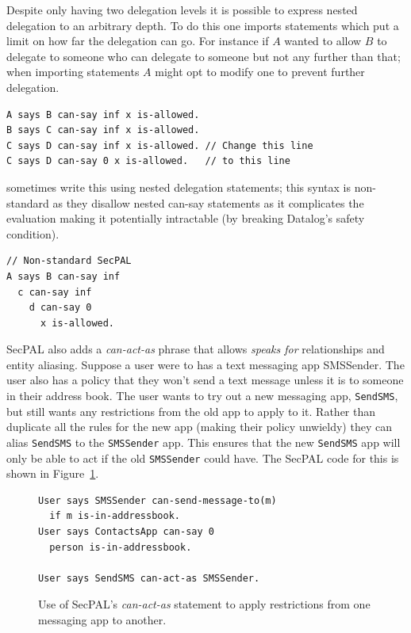 \documentclass[a4paper]{article}
\begin{document}
Despite only having two delegation levels it is possible to express nested
delegation to an arbitrary depth.  To do this one imports statements which put a
limit on how far the delegation can go.  For instance if $A$ wanted to allow $B$
to delegate to someone who can delegate to someone but not any further than
that; when importing statements $A$ might opt to modify one to prevent further
delegation.

\begin{lstlisting}[language=SecPAL]
A says B can-say inf x is-allowed.
B says C can-say inf x is-allowed. 
C says D can-say inf x is-allowed. // Change this line
C says D can-say 0 x is-allowed.   // to this line
\end{lstlisting}

\citeauthor{Becker:2006vh} sometimes write this using nested delegation
statements; this syntax is non-standard as they disallow nested can-say
statements as it complicates the evaluation making it potentially intractable
(by breaking Datalog's safety condition).

\begin{lstlisting}[language=SecPAL]
// Non-standard SecPAL
A says B can-say inf 
  c can-say inf
    d can-say 0 
      x is-allowed.
\end{lstlisting}

{SecPAL} also adds a \emph{can-act-as} phrase that allows \emph{speaks for}
relationships and entity aliasing.  Suppose a user were to has a text messaging
app SMSSender.  The user also has a policy that they won't send a text message
unless it is to someone in their address book.  The user wants to try out a new
messaging app, \texttt{SendSMS}, but still wants any restrictions from the old
app to apply to it.  Rather than duplicate all the rules for the new app (making
their policy unwieldy) they can alias \texttt{SendSMS} to the \texttt{SMSSender}
app.  This ensures that the new \texttt{SendSMS} app will only be able to act if
the old \texttt{SMSSender} could have. The SecPAL code for this is shown in
Figure~\ref{fig:canactas}.

\begin{figure}
\begin{lstlisting}[language=SecPAL]
User says SMSSender can-send-message-to(m) 
  if m is-in-addressbook.
User says ContactsApp can-say 0 
  person is-in-addressbook.

User says SendSMS can-act-as SMSSender.
\end{lstlisting}
\caption{Use of SecPAL's \emph{can-act-as} statement to apply restrictions from
one messaging app to another.}
\label{fig:canactas}
\end{figure}
\end{document}
